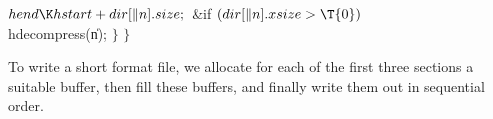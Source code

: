 ${}\index{hend+\\{hend}}\\{hend}\K\index{hstart+\\{hstart}}\\{hstart}+\index{dir+\\{dir}}\\{dir}[\|n].\index{size+\\{size}}\\{size};{}$\6
\&{if} ${}(\index{dir+\\{dir}}\\{dir}[\|n].\index{xsize+\\{xsize}}\\{xsize}>\T{0}){}$\1\5
\\{hdecompress}(\|n);\2\6
\4${}\}{}$\2\6
\4${}\}{}$\2
\Y
\fi


To write a short format file, we allocate for each of the first three sections a
suitable buffer, then fill these buffers, and finally write them
out in sequential order.

